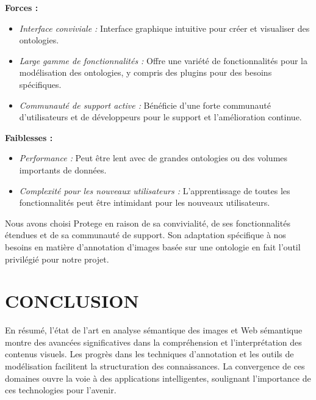 \begin{itemize}
	\textbf{Forces :}
	\begin{itemize}
		\item \textit{Interface conviviale :} Interface graphique intuitive pour créer et visualiser des ontologies.
		\item \textit{Large gamme de fonctionnalités :} Offre une variété de fonctionnalités pour la modélisation des ontologies, y compris des plugins pour des besoins spécifiques.
		\item \textit{Communauté de support active :} Bénéficie d'une forte communauté d'utilisateurs et de développeurs pour le support et l'amélioration continue.
	\end{itemize}
	
	\textbf{Faiblesses :}
	\begin{itemize}
		\item \textit{Performance :} Peut être lent avec de grandes ontologies ou des volumes importants de données.
		\item \textit{Complexité pour les nouveaux utilisateurs :} L'apprentissage de toutes les fonctionnalités peut être intimidant pour les nouveaux utilisateurs.
	\end{itemize}
\end{itemize}

Nous avons choisi Protege en raison de sa convivialité, de ses fonctionnalités étendues et de sa communauté de support. Son adaptation spécifique à nos besoins en matière d'annotation d'images basée sur une ontologie en fait l'outil privilégié pour notre projet.


\section{CONCLUSION}
En résumé, l'état de l'art en analyse sémantique des images et Web sémantique montre des avancées significatives dans la compréhension et l'interprétation des contenus visuels. Les progrès dans les techniques d'annotation et les outils de modélisation facilitent la structuration des connaissances. La convergence de ces domaines ouvre la voie à des applications intelligentes, soulignant l'importance de ces technologies pour l'avenir.
